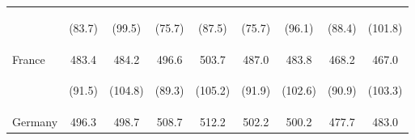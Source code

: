\begin{center}
\begin{tabular}{lcccccccc}
 & \begin{footnotesize}(83.7)\end{footnotesize} & \begin{footnotesize}(99.5)\end{footnotesize} & \begin{footnotesize}(75.7)\end{footnotesize} & \begin{footnotesize}(87.5)\end{footnotesize} & \begin{footnotesize}(75.7)\end{footnotesize} & \begin{footnotesize}(96.1)\end{footnotesize} & \begin{footnotesize}(88.4)\end{footnotesize} & \begin{footnotesize}(101.8)\end{footnotesize}\\
\noalign{\smallskip}France & 483.4 & 484.2 & 496.6 & 503.7 & 487.0 & 483.8 & 468.2 & 467.0\\
 & \begin{footnotesize}(91.5)\end{footnotesize} & \begin{footnotesize}(104.8)\end{footnotesize} & \begin{footnotesize}(89.3)\end{footnotesize} & \begin{footnotesize}(105.2)\end{footnotesize} & \begin{footnotesize}(91.9)\end{footnotesize} & \begin{footnotesize}(102.6)\end{footnotesize} & \begin{footnotesize}(90.9)\end{footnotesize} & \begin{footnotesize}(103.3)\end{footnotesize}\\
\noalign{\smallskip}Germany & 496.3 & 498.7 & 508.7 & 512.2 & 502.2 & 500.2 & 477.7 & 483.0\\

\end{tabular}
\end{center}
